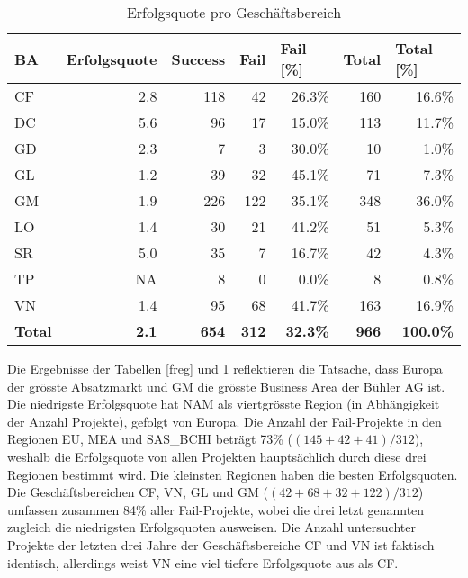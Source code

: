 \begin{table}[H]
	\centering
	\caption{Erfolgsquote pro Geschäftsbereich}
	\begin{tabular}{lrrrrrr}
		\textbf{BA}   & \multicolumn{1}{l}{\textbf{Erfolgsquote}} & \multicolumn{1}{l}{\textbf{Success}} & \multicolumn{1}{l}{\textbf{Fail}} & \multicolumn{1}{l}{\textbf{Fail [\%]}} & \multicolumn{1}{l}{\textbf{Total}} & \multicolumn{1}{l}{\textbf{Total [\%]}} \\ \hline
		CF    & 2.8   & 118   & 42    & 26.3\% & 160   & 16.6\% \\
		DC    & 5.6   & 96    & 17    & 15.0\% & 113   & 11.7\% \\
		GD    & 2.3   & 7     & 3     & 30.0\% & 10    & 1.0\% \\
		GL    & 1.2   & 39    & 32    & 45.1\% & 71    & 7.3\% \\
		GM    & 1.9   & 226   & 122   & 35.1\% & 348   & 36.0\% \\
		LO    & 1.4   & 30    & 21    & 41.2\% & 51    & 5.3\% \\
		SR    & 5.0   & 35    & 7     & 16.7\% & 42    & 4.3\% \\
		TP    & NA      & 8     & 0     & 0.0\% & 8     & 0.8\% \\
		VN    & 1.4   & 95    & 68    & 41.7\% & 163   & 16.9\% \\\hline
		\textbf{Total } & \textbf{2.1} & \textbf{654} & \textbf{312} & \textbf{32.3\%} & \textbf{966} & \textbf{100.0\%} \\
	\end{tabular}%
	\label{fba}%
\end{table}%
Die Ergebnisse der Tabellen \ref{freg} und \ref{fba} reflektieren die Tatsache, dass Europa der grösste Absatzmarkt und GM die grösste Business Area der Bühler AG ist. Die niedrigste Erfolgsquote hat NAM als viertgrösste Region (in Abhängigkeit der Anzahl Projekte), gefolgt von Europa. Die Anzahl der Fail-Projekte in den Regionen EU, MEA und SAS\_BCHI beträgt 73\% ($(145+42+41)/312$), weshalb die Erfolgsquote von allen Projekten hauptsächlich durch diese drei Regionen bestimmt wird. Die kleinsten Regionen haben die besten Erfolgsquoten. Die Geschäftsbereichen CF, VN, GL und GM ($(42+68+32+122)/312$) umfassen zusammen 84\% aller Fail-Projekte, wobei die drei letzt genannten zugleich die niedrigsten Erfolgsquoten ausweisen. Die Anzahl untersuchter Projekte der letzten drei Jahre der Geschäftsbereiche CF und VN ist faktisch identisch, allerdings weist VN eine viel tiefere Erfolgsquote aus als CF.
